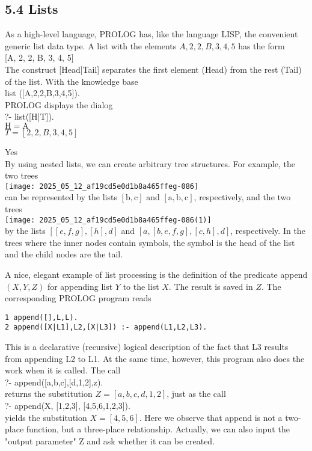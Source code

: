 \documentclass[10pt]{article}
\begin{document}
\subsection*{5.4 Lists}
As a high-level language, PROLOG has, like the language LISP, the convenient generic list data type. A list with the elements $A, 2,2, B, 3,4,5$ has the form\\[0pt]
[A, 2, 2, B, 3, 4, 5]\\[0pt]
The construct [Head|Tail] separates the first element (Head) from the rest (Tail) of the list. With the knowledge base\\[0pt]
list ([A,2,2,B,3,4,5]).\\
PROLOG displays the dialog\\[0pt]
?- list([H|T]).\\
$\mathrm{H}=\mathrm{A}$\\
$T=[2,2, B, 3,4,5]$

Yes\\
By using nested lists, we can create arbitrary tree structures. For example, the two trees\\
\texttt{[image: 2025\_05\_12\_af19cd5e0d1b8a465ffeg-086]}\\
can be represented by the lists $[\mathrm{b}, \mathrm{c}]$ and $[\mathrm{a}, \mathrm{b}, \mathrm{c}]$, respectively, and the two trees\\
\texttt{[image: 2025\_05\_12\_af19cd5e0d1b8a465ffeg-086(1)]}\\
by the lists $[[e, f, g],[h], d]$ and $[a,[b, e, f, g],[c, h], d]$, respectively. In the trees where the inner nodes contain symbols, the symbol is the head of the list and the child nodes are the tail.

A nice, elegant example of list processing is the definition of the predicate append $(X, Y, Z)$ for appending list $Y$ to the list $X$. The result is saved in $Z$. The corresponding PROLOG program reads

\begin{verbatim}
1 append([],L,L).
2 append([X|L1],L2,[X|L3]) :- append(L1,L2,L3).
\end{verbatim}

This is a declarative (recursive) logical description of the fact that L3 results from appending L2 to L1. At the same time, however, this program also does the work when it is called. The call\\[0pt]
?- append([a,b,c],[d,1,2],z).\\
returns the substitution $Z=[a, b, c, d, 1,2]$, just as the call\\[0pt]
?- append(X, [1,2,3], [4,5,6,1,2,3]).\\
yields the substitution $X=[4,5,6]$. Here we observe that append is not a two-place function, but a three-place relationship. Actually, we can also input the "output parameter" Z and ask whether it can be created.
\end{document}
